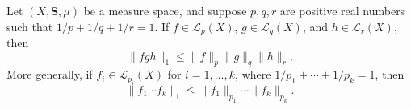Let $(X, \mathbf{S}, \mu)$ be a measure space, and suppose $p, q, r$ are positive real numbers such that $1/p + 1/q + 1/r = 1$. If $f \in \mathcal{L}_p(X)$, $g \in \mathcal{L}_q(X)$, and $h \in \mathcal{L}_r(X)$, then
$$\| fgh \|_1 \leq \| f \|_p \| g \|_q \| h \|_r.$$
More generally, if $f_i \in \mathcal{L}_{p_i}(X)$ for $i = 1, \ldots, k$, where $1/p_1 + \cdots + 1/p_k = 1$, then
$$\| f_1 \cdots f_k \|_1 \leq \| f_1 \|_{p_1} \cdots \| f_k \|_{p_k}.$$
